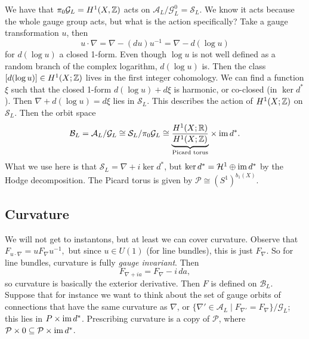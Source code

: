 We have that $\pi_0 \mathcal G_L = H^1(X,\mathbb{Z})$ acts on $\mathcal A_L / \mathcal G^0_L = \mathcal S_L$. We know it acts because the whole gauge group acts, but what is the action specifically? Take a gauge transformation $u$, then \[
    u \cdot \nabla = \nabla - (du) u^{-1} = \nabla - d(\log u)
\] for $d(\log u)$ a closed 1-form. Even though $\log u$ is not well defined as a random branch of the complex logarithm, $d (\log u)$ is. Then the class $[d (\log u)] \in H^1(X;\mathbb{Z})$ lives in the first integer cohomology. We can find a function $\xi$ such that the closed 1-form $d(\log u) + d\xi$ is harmonic, or co-closed (in $\ker d^*$). Then $\nabla + d (\log u) = d \xi$ lies in $\mathcal S_L$. This describes the action of $H^1(X;\mathbb{Z})$ on $\mathcal S_L$.
Then the orbit space \[
    \mathcal B_L = \mathcal A_L /\mathcal G_L \cong  \mathcal S_L / \pi_0 \mathcal G_L \cong  \underset{\text{Picard torus} }{\underbrace{\frac{H^1(X;\mathbb{R})}{H^1(X;\mathbb{Z})}}} \times \operatorname{im} d^*.
\] What we use here is that $\mathcal S_L = \nabla + i\ker d^*$, but $\ker d^*=\mathcal H^1 \oplus \operatorname{im}  d^*$ by the Hodge decomposition. The Picard torus is given by $\mathcal P \cong  \left( S^1  \right) ^{b_1(X)}$.

\subsection{Curvature}
We will not get to instantons, but at least we can cover curvature. Observe that $F_{u \cdot \nabla} = u F_{\nabla}u^{-1},$ but since $u \in U(1)$ (for line bundles), this is just $F_{\nabla}$. So for line bundles, curvature is fully \emph{gauge invariant}. Then \[
F _{\nabla+ ia}= F_{\nabla}-i\,da,
\] so curvature is basically the exterior derivative. Then $F$ is defined on $\mathcal B_L$. Suppose that for instance we want to think about the set of gauge orbits of connections that have the same curvature as $\nabla$, or $\{\nabla' \in \mathcal A_L \mid  F_{\nabla'}= F_{\nabla}\} / \mathcal G_L$; this lies in $P \times \operatorname{im} d^*$.  Prescribing curvature is a copy of $\mathcal P$, where $\mathcal P \times 0 \subseteq \mathcal P \times \operatorname{im} d^*$.
